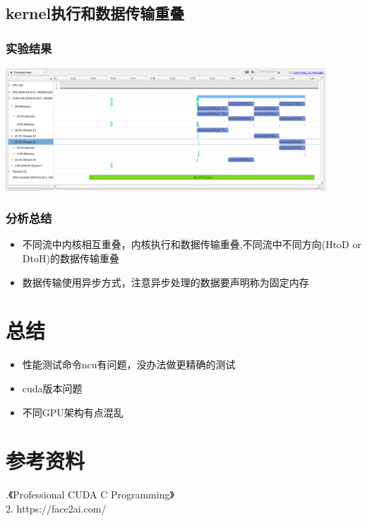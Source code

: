 \subsection{kernel执行和数据传输重叠}
\subsubsection{实验结果}
\noindent
\includegraphics[width=0.9\textwidth]{assets/overlap.png}
\subsubsection{分析总结}
\noindent
\begin{itemize}
	\item 不同流中内核相互重叠，内核执行和数据传输重叠,不同流中不同方向(HtoD or DtoH)的数据传输重叠
	\item 数据传输使用异步方式，注意异步处理的数据要声明称为固定内存
\end{itemize}

\section{总结}
\begin{itemize}
	\item 性能测试命令ncu有问题，没办法做更精确的测试
	\item cuda版本问题
	\item 不同GPU架构有点混乱
\end{itemize}
\section{参考资料}
.《Professional CUDA C Programming》 \\
2. https://face2ai.com/
